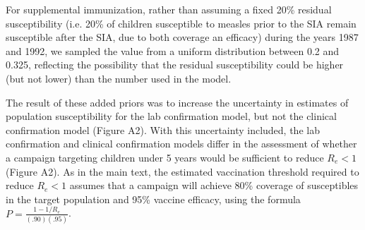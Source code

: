 For supplemental immunization, rather than assuming a fixed 20\% residual susceptibility (i.e. 20\% of children susceptible to measles prior to the SIA remain susceptible after the SIA, due to both coverage an efficacy) during the years 1987 and 1992, we sampled the value from a uniform distribution between 0.2 and 0.325, reflecting the possibility that the residual susceptibility could be higher (but not lower) than the number used in the model.  

The result of these added priors was to increase the uncertainty in estimates of population susceptibility for the lab confirmation model, but not the clinical confirmation model (Figure A2). With this uncertainty included, the lab confirmation and clinical confirmation models differ in the assessment of whether a campaign targeting children under 5 years would be sufficient to reduce $R_e < 1$ (Figure A2). As in the main text, the estimated vaccination threshold required to reduce $R_e < 1$ assumes that a campaign will achieve 80\% coverage of susceptibles in the target population and 95\% vaccine efficacy, using the formula $P = \frac{1-1/R_e}{(.90)(.95)}$. 